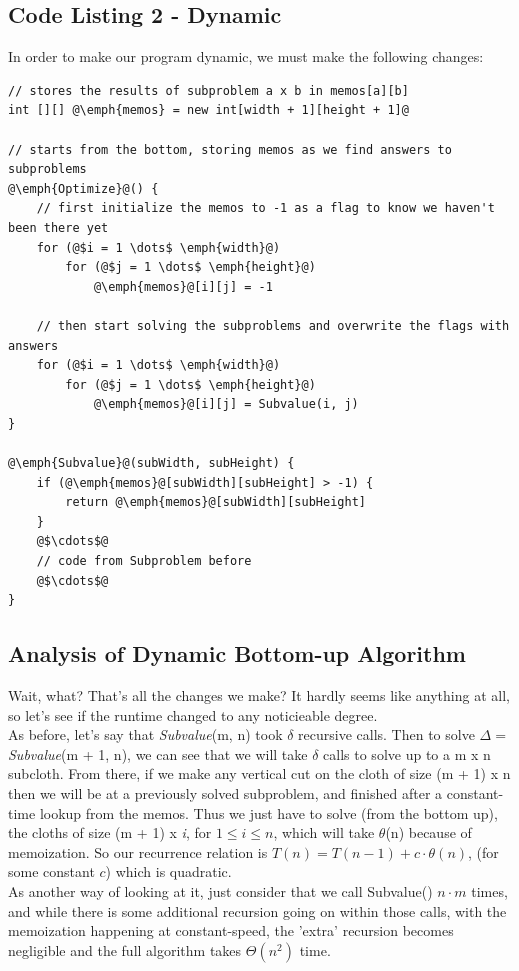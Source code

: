 \documentclass[paper=a4, fontsize=11pt]{scrartcl} %
\numberwithin{equation}{section} %
\numberwithin{figure}{section} %
\numberwithin{table}{section} %
\begin{document}
\subsection{Code Listing 2 - Dynamic}
In order to make our program dynamic, we must make the following changes:\\
\begin{lstlisting}
// stores the results of subproblem a x b in memos[a][b]
int [][] @\emph{memos} = new int[width + 1][height + 1]@

// starts from the bottom, storing memos as we find answers to subproblems
@\emph{Optimize}@() {
	// first initialize the memos to -1 as a flag to know we haven't been there yet
	for (@$i = 1 \dots$ \emph{width}@) 	
		for (@$j = 1 \dots$ \emph{height}@) 
			@\emph{memos}@[i][j] = -1
			
	// then start solving the subproblems and overwrite the flags with answers
	for (@$i = 1 \dots$ \emph{width}@) 	
		for (@$j = 1 \dots$ \emph{height}@) 
			@\emph{memos}@[i][j] = Subvalue(i, j)
}

@\emph{Subvalue}@(subWidth, subHeight) {
	if (@\emph{memos}@[subWidth][subHeight] > -1) {
		return @\emph{memos}@[subWidth][subHeight]
	}	
	@$\cdots$@
	// code from Subproblem before
	@$\cdots$@
}
\end{lstlisting}


\subsection{Analysis of Dynamic Bottom-up Algorithm}

Wait, what? That's all the changes we make? It hardly seems like anything at all, so let's see if the runtime changed to any noticieable degree. \\ 
\indent As before, let's say that \emph{Subvalue}(m, n) took $\delta$ recursive calls. Then to solve $\Delta = $ \emph{Subvalue}(m + 1, n), we can see that we will take $\delta$ calls to solve up to a m x n subcloth. From there, if we make any vertical cut on the cloth of size (m + 1) x n then we will be at a previously solved subproblem, and finished after a constant-time lookup from the memos. Thus we just have to solve (from the bottom up), the cloths of size (m + 1) x \emph{i}, for $1 \le i \le n$, which will take $\theta$(n) because of memoization. So our recurrence relation is $T(n) = T(n-1) + c \cdot \theta(n)$, (for some constant $c$) which is quadratic. \\
\indent As another way of looking at it, just consider that we call Subvalue() $n \cdot m$ times, and while there is some additional recursion going on within those calls, with the memoization happening at constant-speed, the 'extra' recursion becomes negligible and the full algorithm takes $\Theta(n^2)$ time.  
\end{document}
